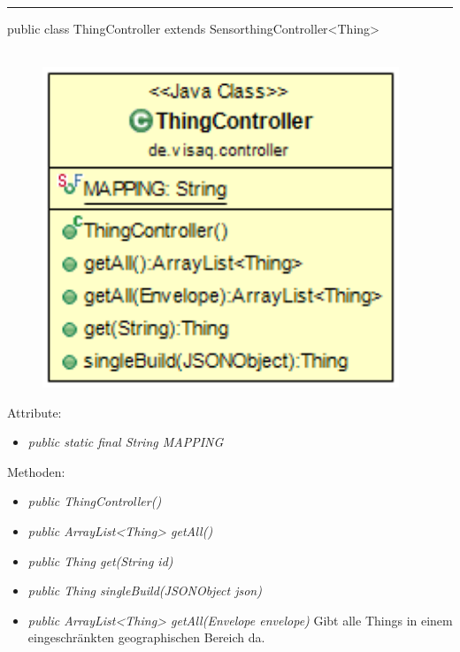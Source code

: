 \rule{\textwidth}{0.4pt}
public class ThingController extends SensorthingController<Thing>
\\\\
\begin{minipage}{0.3\textwidth}
    \begin{figure}[H]
        {\centering\includegraphics[width=0.95\textwidth]{media/backend/controller/classes/ThingController.png}}
    \end{figure}
    \end{minipage} \hfill
\begin{minipage}{0.7\textwidth}
\end{minipage}

Attribute:
\begin{itemize}
    \item \emph{public static final String MAPPING} \mappingDescription
\end{itemize}
Methoden:
\begin{itemize}
    \item \emph{public ThingController()}
    \item \emph{public ArrayList<Thing> getAll()}
    \extendsSensorthingController
    \item \emph{public Thing get(String id)}
    \extendsSensorthingController
    \item \emph{public Thing singleBuild(JSONObject json)}
    \extendsSensorthingController
    \item \emph{public ArrayList<Thing> getAll(Envelope envelope)}
    Gibt alle Things in einem eingeschränkten geographischen Bereich da.
\end{itemize}

